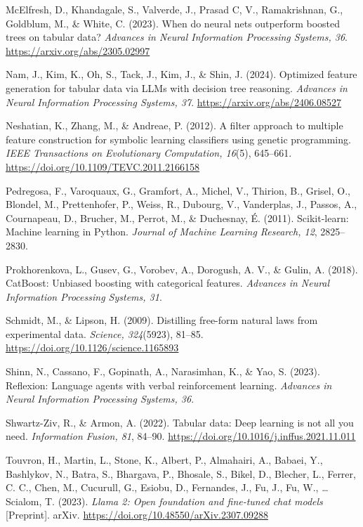 \documentclass[11pt]{article}
\begin{document}
McElfresh, D., Khandagale, S., Valverde, J., Prasad C, V., Ramakrishnan, G., Goldblum, M., \& White,
C. (2023). When do neural nets outperform boosted trees on tabular data? \emph{Advances in Neural
Information Processing Systems, 36}. \url{https://arxiv.org/abs/2305.02997}

Nam, J., Kim, K., Oh, S., Tack, J., Kim, J., \& Shin, J. (2024). Optimized feature generation for
tabular data via LLMs with decision tree reasoning. \emph{Advances in Neural Information Processing
Systems, 37}. \url{https://arxiv.org/abs/2406.08527}

Neshatian, K., Zhang, M., \& Andreae, P. (2012). A filter approach to multiple feature construction
for symbolic learning classifiers using genetic programming. \emph{IEEE Transactions on Evolutionary
Computation, 16}(5), 645--661. \url{https://doi.org/10.1109/TEVC.2011.2166158}

Pedregosa, F., Varoquaux, G., Gramfort, A., Michel, V., Thirion, B., Grisel, O., Blondel, M.,
Prettenhofer, P., Weiss, R., Dubourg, V., Vanderplas, J., Passos, A., Cournapeau, D., Brucher, M.,
Perrot, M., \& Duchesnay, É. (2011). Scikit-learn: Machine learning in Python. \emph{Journal of
Machine Learning Research, 12}, 2825--2830.

Prokhorenkova, L., Gusev, G., Vorobev, A., Dorogush, A. V., \& Gulin, A. (2018). CatBoost: Unbiased
boosting with categorical features. \emph{Advances in Neural Information Processing Systems, 31}.

Schmidt, M., \& Lipson, H. (2009). Distilling free-form natural laws from experimental data.
\emph{Science, 324}(5923), 81--85. \url{https://doi.org/10.1126/science.1165893}

Shinn, N., Cassano, F., Gopinath, A., Narasimhan, K., \& Yao, S. (2023). Reflexion: Language agents
with verbal reinforcement learning. \emph{Advances in Neural Information Processing Systems, 36}.

Shwartz-Ziv, R., \& Armon, A. (2022). Tabular data: Deep learning is not all you need.
\emph{Information Fusion, 81}, 84--90. \url{https://doi.org/10.1016/j.inffus.2021.11.011}

Touvron, H., Martin, L., Stone, K., Albert, P., Almahairi, A., Babaei, Y., Bashlykov, N., Batra, S.,
Bhargava, P., Bhosale, S., Bikel, D., Blecher, L., Ferrer, C. C., Chen, M., Cucurull, G., Esiobu, D.,
Fernandes, J., Fu, J., Fu, W., \ldots{} Scialom, T. (2023). \emph{Llama 2: Open foundation and
fine-tuned chat models} [Preprint]. arXiv. \url{https://doi.org/10.48550/arXiv.2307.09288}
\end{document}
